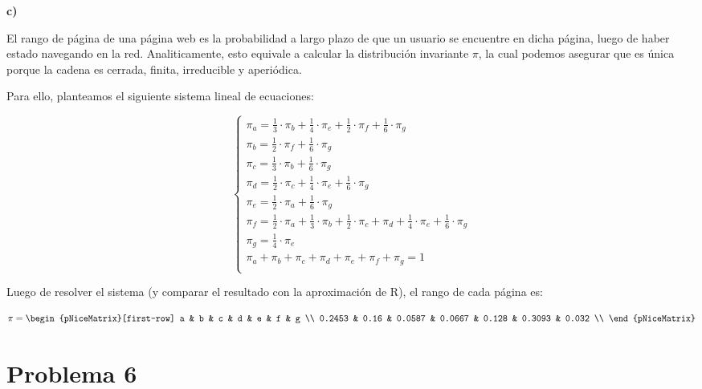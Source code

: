 \documentclass[11pt]{article}
\begin{document}
\textbf{c)}

El rango de página de una página web es la probabilidad a largo plazo de que un usuario se encuentre en dicha página, luego de haber estado navegando en la red. Analiticamente, esto equivale a calcular la distribución invariante $\pi$, la cual podemos asegurar que es única porque la cadena es cerrada, finita, irreducible y aperiódica.

Para ello, planteamos el siguiente sistema lineal de ecuaciones:

\begin{equation}
    \begin{cases}
        \pi_a = \frac{1}{3} \cdot \pi_b + \frac{1}{4} \cdot \pi_e + \frac{1}{2} \cdot \pi_f + \frac{1}{6} \cdot \pi_g \\
        \pi_b = \frac{1}{2} \cdot \pi_f + \frac{1}{6} \cdot \pi_g \\
        \pi_c = \frac{1}{3} \cdot \pi_b + \frac{1}{6} \cdot \pi_g \\
        \pi_d = \frac{1}{2} \cdot \pi_c + \frac{1}{4} \cdot \pi_e + \frac{1}{6} \cdot \pi_g \\
        \pi_e = \frac{1}{2} \cdot \pi_a + \frac{1}{6} \cdot \pi_g \\
        \pi_f = \frac{1}{2} \cdot \pi_a + \frac{1}{3} \cdot \pi_b + \frac{1}{2} \cdot \pi_c + \pi_d + \frac{1}{4} \cdot \pi_e + \frac{1}{6} \cdot \pi_g \\
        \pi_g = \frac{1}{4} \cdot \pi_e \\
        \pi_a + \pi_b + \pi_c + \pi_d + \pi_e + \pi_f + \pi_g = 1 \\
    \end{cases}
\end{equation}

Luego de resolver el sistema (y comparar el resultado con la aproximación de R), el rango de cada página es:

\begin{equation}
    \pi = \begin{pNiceMatrix}[first-row]
        a      & b    & c      & d      & e     & f      & g     \\
        0.2453 & 0.16 & 0.0587 & 0.0667 & 0.128 & 0.3093 & 0.032 \\
    \end{pNiceMatrix}
\end{equation}

\section*{Problema 6}
\end{document}
